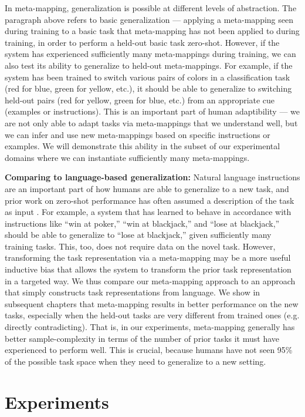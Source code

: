 In meta-mapping, generalization is possible at different levels of abstraction. The paragraph above refers to basic generalization --- applying a meta-mapping seen during training to a basic task that meta-mapping has not been applied to during training, in order to perform a held-out basic task zero-shot. However, if the system has experienced sufficiently many meta-mappings during training, we can also test its ability to generalize to held-out meta-mappings. For example, if the system has been trained to switch various pairs of colors in a classification task (red for blue, green for yellow, etc.), it should be able to generalize to switching held-out pairs (red for yellow, green for blue, etc.) from an appropriate cue (examples or instructions). This is an important part of human adaptibility --- we are not only able to adapt tasks via meta-mappings that we understand well, but we can infer and use new meta-mappings based on specific instructions or examples. We will demonstrate this ability in the subset of our experimental domains where we can instantiate sufficiently many meta-mappings. 

\textbf{Comparing to language-based generalization:} Natural language instructions are an important part of how humans are able to generalize to a new task, and prior work on zero-shot performance has often assumed a description of the task as input \citep[e.g.]{Larochelle2008}. For example, a system that has learned to behave in accordance with instructions like ``win at poker,'' ``win at blackjack,'' and ``lose at blackjack,'' should be able to generalize to ``lose at blackjack,'' given sufficiently many training tasks. This, too, does not require data on the novel task. However, transforming the task representation via a meta-mapping may be a more useful inductive bias that allows the system to transform the prior task representation in a targeted way. We thus compare our meta-mapping approach to an approach that simply constructs task representations from language. We show in subsequent chapters that meta-mapping results in better performance on the new tasks, especially when the held-out tasks are very different from trained ones (e.g. directly contradicting). That is, in our experiments, meta-mapping generally has better sample-complexity in terms of the number of prior tasks it must have experienced to perform well. This is crucial, because humans have not seen 95\% of the possible task space when they need to generalize to a new setting.

\section{Experiments}


